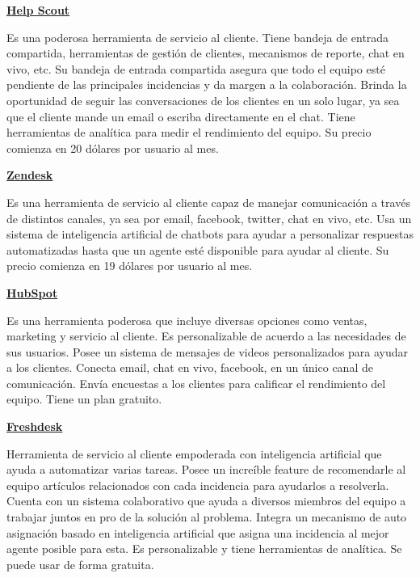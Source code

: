 \textbf{\href{https://www.helpscout.com/}{Help Scout}}
\newline

Es una poderosa herramienta de servicio al cliente. Tiene bandeja de entrada compartida, herramientas de gestión de clientes, mecanismos de reporte, chat en vivo, etc. Su bandeja de entrada compartida asegura que todo el equipo esté pendiente de las principales incidencias y da margen a la colaboración. Brinda la oportunidad de seguir las conversaciones de los clientes en un solo lugar, ya sea que el cliente mande un email o escriba directamente en el chat. Tiene herramientas de analítica para medir el rendimiento del equipo. Su precio comienza en 20 dólares por usuario al mes.
\newline

\textbf{\href{https://www.zendesk.com/}{Zendesk}}
\newline

Es una herramienta de servicio al cliente capaz de manejar comunicación a través de distintos canales, ya sea por email, facebook, twitter, chat en vivo, etc. Usa un sistema de inteligencia artificial de chatbots para ayudar a personalizar respuestas automatizadas hasta que un agente esté disponible para ayudar al cliente. Su precio comienza en 19 dólares por usuario al mes.
\newline

\textbf{\href{https://www.hubspot.com/}{HubSpot}}
\newline

Es una herramienta poderosa que incluye diversas opciones como ventas, marketing y servicio al cliente. Es personalizable de acuerdo a las necesidades de sus usuarios. Posee un sistema de mensajes de videos personalizados para ayudar a los clientes. Conecta email, chat en vivo, facebook, en un único canal de comunicación. Envía encuestas a los clientes para calificar el rendimiento del equipo. Tiene un plan gratuito.
\newline

\textbf{\href{https://freshdesk.com/}{Freshdesk}}
\newline

Herramienta de servicio al cliente empoderada con inteligencia artificial que ayuda a automatizar varias tareas. Posee un increíble feature de recomendarle al equipo artículos relacionados con cada incidencia para ayudarlos a resolverla. Cuenta con un sistema colaborativo que ayuda a diversos miembros del equipo a trabajar juntos en pro de la solución al problema. Integra un mecanismo de auto asignación basado en inteligencia artificial que asigna una incidencia al mejor agente posible para esta. Es personalizable y tiene herramientas de analítica. Se puede usar de forma gratuita.
\newline

